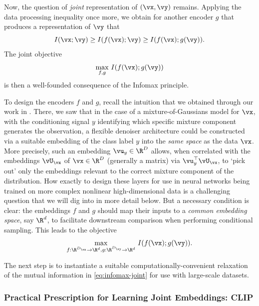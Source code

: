 \documentclass[../../book-main.tex]{subfiles}
\begin{document}
Now, the question of \textit{joint} representation of $(\vx, \vy)$ remains.
Applying the data processing inequality once more, we obtain for another encoder
$g$ that produces a representation of $\vy$ that
\begin{equation*}
    I(\vx; \vy) \geq I(f(\vx); \vy) \geq I(f(\vx); g(\vy)).
\end{equation*}
The joint objective
\begin{equation}\label{eq:infomax-x-y}
    \max_{f, g}\, I(f(\vx); g(\vy))
\end{equation}
is then a well-founded consequence of the Infomax principle.

To design the encoders $f$ and $g$, recall the intuition that we obtained
through our work in
. There, we saw
that in the case of a mixture-of-Gaussians model for $\vx$, with the
conditioning signal $y$ identifying which specific mixture component generates
the observation, a flexible denoiser architecture could be constructed via
a suitable embedding of the class label $y$ into the \textit{same space} as the
data $\vx$.
More precisely, such an embedding $\vu_y \in \R^D$ allows, when correlated
with the embeddings $\vU_{\vx}$ of $\vx \in \R^{D}$ (generally a
matrix) via $\vu_y^\top
\vU_{\vx}$, to `pick out' only the embeddings relevant to the correct mixture
component of the distribution.
How exactly to design these layers for use in neural networks being trained on
more
complex nonlinear high-dimensional data is a challenging question
that we will dig into in
more detail below. But a necessary condition is clear: the embeddings
$f$ and $g$ should map their inputs to a \textit{common embedding space}, say
$\R^d$, to facilitate downstream comparison when performing conditional
sampling.
This leads to the objective
\begin{equation}\label{eq:infomax-joint}
    \max_{f : \R^{D_{\vx}} \to \R^{d}, g: \R^{D_{\vy}} \to \R^d}\,
    I(f(\vx); g(\vy)).
\end{equation}

The next step is to instantiate a suitable computationally-convenient relaxation
of the mutual information in \eqref{eq:infomax-joint} for use with large-scale
datasets.

\subsubsection{Practical Prescription for Learning Joint Embeddings: CLIP}
\end{document}
